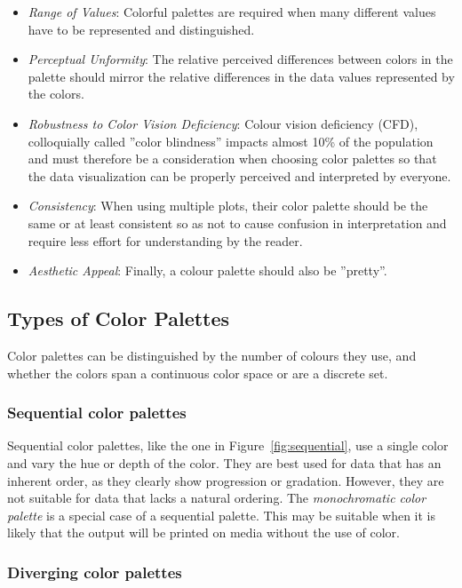 \begin{itemize}
   \item \emph{Range of Values}: Colorful palettes are required when many different values have to be represented and distinguished.
   \item \emph{Perceptual Unformity}: The relative perceived differences between colors in the palette should mirror the relative differences in the data values represented by the colors.
   \item \emph{Robustness to Color Vision Deficiency}: Colour vision deficiency (CFD), colloquially called ''color blindness'' impacts almost 10\% of the population and must therefore be a consideration when choosing color palettes so that the data visualization can be properly perceived and interpreted by everyone.
   \item \emph{Consistency}: When using multiple plots, their color palette should be the same or at least consistent so as not to cause confusion in interpretation and require less effort for understanding by the reader.
   \item \emph{Aesthetic Appeal}: Finally, a colour palette should also be ''pretty''.
\end{itemize}

\subsection*{Types of Color Palettes}

Color palettes can be distinguished by the number of colours they use, and whether the colors span a continuous color space or are a discrete set. 

\subsubsection*{Sequential color palettes}

Sequential color palettes, like the one in Figure~\ref{fig:sequential}, use a single color and vary the hue or depth of the color. They are best used for data that has an inherent order, as they clearly show progression or gradation. However, they are not suitable for data that lacks a natural ordering. The \emph{monochromatic color palette} is a special case of a sequential palette. This may be suitable when it is likely that the output will be printed on media without the use of color. 

\subsubsection*{Diverging color palettes}

